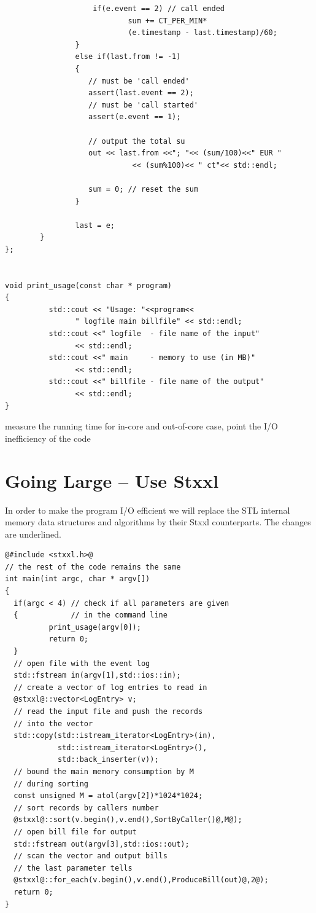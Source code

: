 \documentclass[twoside]{book}
\newcommand{\stxxl}{{\sc Stxxl} }
\begin{document}
\begin{lstlisting}
                    if(e.event == 2) // call ended
                            sum += CT_PER_MIN*
                            (e.timestamp - last.timestamp)/60;
                }
                else if(last.from != -1)
                {
                   // must be 'call ended'
                   assert(last.event == 2);
                   // must be 'call started'
                   assert(e.event == 1);
                        
                   // output the total su
                   out << last.from <<"; "<< (sum/100)<<" EUR "
                             << (sum%100)<< " ct"<< std::endl;
                        
                   sum = 0; // reset the sum
                }
                        
                last = e;
        }
};


void print_usage(const char * program)
{
          std::cout << "Usage: "<<program<<
                " logfile main billfile" << std::endl;
          std::cout <<" logfile  - file name of the input"
                << std::endl;
          std::cout <<" main     - memory to use (in MB)"
                << std::endl;
          std::cout <<" billfile - file name of the output"
                << std::endl;
}

\end{lstlisting}

measure the running time for in-core and out-of-core case,
point the I/O inefficiency of the code

\section{Going Large -- Use \stxxl}
In order to make the program I/O efficient we will replace the STL
internal memory data structures and algorithms by their \stxxl
counterparts. The changes are underlined.

\begin{lstlisting}
@#include <stxxl.h>@
// the rest of the code remains the same
int main(int argc, char * argv[])
{
  if(argc < 4) // check if all parameters are given 
  {            // in the command line
          print_usage(argv[0]);
          return 0;
  }
  // open file with the event log
  std::fstream in(argv[1],std::ios::in);
  // create a vector of log entries to read in
  @stxxl@::vector<LogEntry> v;
  // read the input file and push the records
  // into the vector
  std::copy(std::istream_iterator<LogEntry>(in),
            std::istream_iterator<LogEntry>(),
            std::back_inserter(v));
  // bound the main memory consumption by M 
  // during sorting
  const unsigned M = atol(argv[2])*1024*1024;
  // sort records by callers number
  @stxxl@::sort(v.begin(),v.end(),SortByCaller()@,M@);
  // open bill file for output
  std::fstream out(argv[3],std::ios::out);
  // scan the vector and output bills
  // the last parameter tells
  @stxxl@::for_each(v.begin(),v.end(),ProduceBill(out)@,2@);
  return 0;
}
\end{lstlisting}
\end{document}
